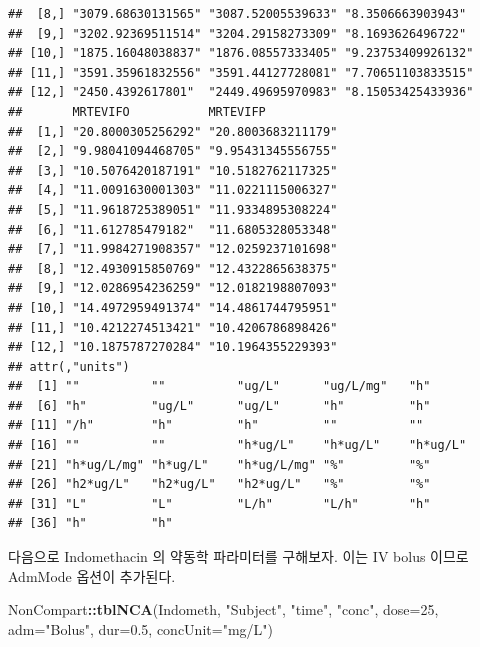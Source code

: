 \documentclass[]{krantz}
\makeatletter
\newenvironment{Shaded}{\begin{snugshade}}{\end{snugshade}}
\newcommand{\KeywordTok}[1]{\textcolor[rgb]{0.13,0.29,0.53}{\textbf{#1}}}
\newcommand{\DataTypeTok}[1]{\textcolor[rgb]{0.13,0.29,0.53}{#1}}
\newcommand{\DecValTok}[1]{\textcolor[rgb]{0.00,0.00,0.81}{#1}}
\newcommand{\FloatTok}[1]{\textcolor[rgb]{0.00,0.00,0.81}{#1}}
\newcommand{\StringTok}[1]{\textcolor[rgb]{0.31,0.60,0.02}{#1}}
\newcommand{\OperatorTok}[1]{\textcolor[rgb]{0.81,0.36,0.00}{\textbf{#1}}}
\newcommand{\NormalTok}[1]{#1}
\newenvironment{kframe}{%
\medskip{}
\setlength{\fboxsep}{.8em}
 \def\at@end@of@kframe{}%
 \ifinner\ifhmode%
  \def\at@end@of@kframe{\end{minipage}}%
  \begin{minipage}{\columnwidth}%
 \fi\fi%
 \def\FrameCommand##1{\hskip\@totalleftmargin \hskip-\fboxsep
 \colorbox{shadecolor}{##1}\hskip-\fboxsep
     \hskip-\linewidth \hskip-\@totalleftmargin \hskip\columnwidth}%
 \MakeFramed {\advance\hsize-\width
   \@totalleftmargin\z@ \linewidth\hsize
   \@setminipage}}%
 {\par\unskip\endMakeFramed%
 \at@end@of@kframe}
\renewenvironment{Shaded}{\begin{kframe}}{\end{kframe}}
\theoremstyle{definition}
\theoremstyle{definition}
\theoremstyle{definition}
\theoremstyle{remark}
\makeatother
\begin{document}
\begin{verbatim}
##  [8,] "3079.68630131565" "3087.52005539633" "8.3506663903943" 
##  [9,] "3202.92369511514" "3204.29158273309" "8.1693626496722" 
## [10,] "1875.16048038837" "1876.08557333405" "9.23753409926132"
## [11,] "3591.35961832556" "3591.44127728081" "7.70651103833515"
## [12,] "2450.4392617801"  "2449.49695970983" "8.15053425433936"
##       MRTEVIFO           MRTEVIFP          
##  [1,] "20.8000305256292" "20.8003683211179"
##  [2,] "9.98041094468705" "9.95431345556755"
##  [3,] "10.5076420187191" "10.5182762117325"
##  [4,] "11.0091630001303" "11.0221115006327"
##  [5,] "11.9618725389051" "11.9334895308224"
##  [6,] "11.612785479182"  "11.6805328053348"
##  [7,] "11.9984271908357" "12.0259237101698"
##  [8,] "12.4930915850769" "12.4322865638375"
##  [9,] "12.0286954236259" "12.0182198807093"
## [10,] "14.4972959491374" "14.4861744795951"
## [11,] "10.4212274513421" "10.4206786898426"
## [12,] "10.1875787270284" "10.1964355229393"
## attr(,"units")
##  [1] ""          ""          "ug/L"      "ug/L/mg"   "h"        
##  [6] "h"         "ug/L"      "ug/L"      "h"         "h"        
## [11] "/h"        "h"         "h"         ""          ""         
## [16] ""          ""          "h*ug/L"    "h*ug/L"    "h*ug/L"   
## [21] "h*ug/L/mg" "h*ug/L"    "h*ug/L/mg" "%"         "%"        
## [26] "h2*ug/L"   "h2*ug/L"   "h2*ug/L"   "%"         "%"        
## [31] "L"         "L"         "L/h"       "L/h"       "h"        
## [36] "h"         "h"
\end{verbatim}

다음으로 Indomethacin 의 약동학 파라미터를 구해보자. 이는 IV bolus
이므로 AdmMode 옵션이 추가된다.

\begin{Shaded}
\begin{Highlighting}[]
\NormalTok{NonCompart}\OperatorTok{::}\KeywordTok{tblNCA}\NormalTok{(Indometh, }\StringTok{"Subject"}\NormalTok{, }\StringTok{"time"}\NormalTok{, }\StringTok{"conc"}\NormalTok{, }\DataTypeTok{dose=}\DecValTok{25}\NormalTok{, }\DataTypeTok{adm=}\StringTok{"Bolus"}\NormalTok{, }\DataTypeTok{dur=}\FloatTok{0.5}\NormalTok{, }\DataTypeTok{concUnit=}\StringTok{"mg/L"}\NormalTok{)}
\end{Highlighting}
\end{Shaded}
\end{document}
